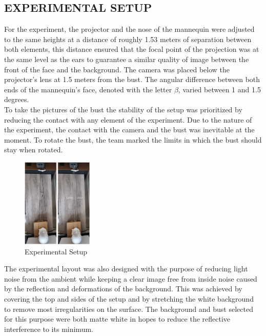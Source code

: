 \subsection{EXPERIMENTAL SETUP}

For the experiment, the projector and the nose of the mannequin were adjusted to the same heights at a distance of roughly 1.53 meters of separation between both elements, this distance ensured that the focal point of the projection was at the same level as the ears to guarantee a similar quality of image between the front of the face and the background. The camera was placed below the projector's lens at 1.5 meters from the bust. The angular difference between both ends of the mannequin's face, denoted with the letter $\beta$, varied between 1 and 1.5 degrees. \\

To take the pictures of the bust the stability of the setup was prioritized by reducing the contact with any element of the experiment. Due to the nature of the experiment, the contact with the camera and the bust was inevitable at the moment. To rotate the bust, the team marked the limits in which the bust should stay when rotated. \\

\begin{figure}[H]
    \centering
    \includegraphics[width=0.3\textwidth, angle =90]{Figures/Exp_Setup.jpg}
    \caption{Experimental Setup}
    \label{fig:Exp_Setup}
\end{figure}

The experimental layout was also designed with the purpose of reducing light noise from the ambient while keeping a clear image free from inside noise caused by the reflection and deformations of the background. This was achieved by covering the top and sides of the setup and by stretching the white background to remove most irregularities on the surface. The background and bust selected for this purpose were both matte white in hopes to reduce the reflective interference to its minimum. \\


